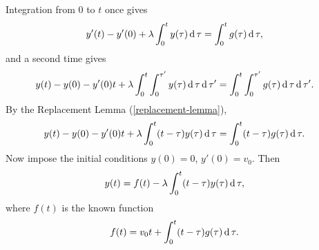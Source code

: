 Integration from $0$ to $t$ once gives
\begin{align*}
  y'(t) - y'(0) + \lambda \int_0^t y(\tau) \operatorname{\text{d}}\tau
  &= \int_0^t g(\tau) \operatorname{\text{d}}\tau,
\end{align*}
and a second time gives
\begin{align*}
  y(t) - y(0) - y'(0)t + \lambda \int_0^t\int_0^{\tau'} y(\tau) \operatorname{\text{d}}\tau \operatorname{\text{d}}\tau'
  &= \int_0^t\int_0^{\tau'} g(\tau) \operatorname{\text{d}}\tau\operatorname{\text{d}}\tau'.
\end{align*}
By the Replacement Lemma (\ref{replacement-lemma}),
\begin{align*}
  y(t) - y(0) - y'(0)t + \lambda \int_0^t (t - \tau) y(\tau) \operatorname{\text{d}}\tau
  &= \int_0^t (t - \tau) g(\tau) \operatorname{\text{d}}\tau.
\end{align*}
Now impose the initial conditions $y(0) = 0$, $y'(0) = v_0$. Then
\begin{align*}
  y(t) &= f(t) - \lambda \int_0^t (t - \tau) y(\tau) \operatorname{\text{d}}\tau,
\end{align*}
where $f(t)$ is the known function
\begin{align*}
  f(t) &= v_0t + \int_0^t (t - \tau) g(\tau) \operatorname{\text{d}}\tau.
\end{align*}


